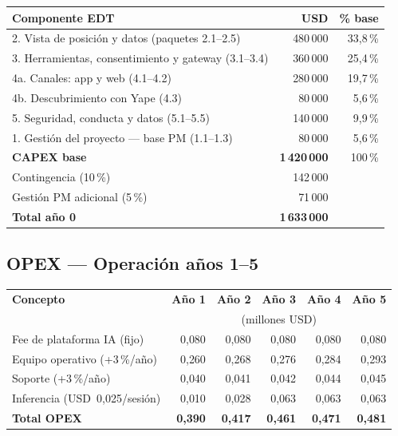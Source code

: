 \documentclass[11pt]{article}
\newcommand{\usd}[1]{USD~#1}
\begin{document}
\begin{tabularx}{\textwidth}{@{}X r r@{}}
\toprule
\textbf{Componente EDT} & \textbf{USD} & \textbf{\% base} \\
\midrule
2. Vista de posición y datos (paquetes 2.1–2.5)         & 480\,000 & 33{,}8\,\% \\
3. Herramientas, consentimiento y gateway (3.1–3.4)     & 360\,000 & 25{,}4\,\% \\
4a. Canales: app y web (4.1–4.2)                        & 280\,000 & 19{,}7\,\% \\
4b. Descubrimiento con Yape (4.3)                       &  80\,000 &  5{,}6\,\% \\
5. Seguridad, conducta y datos (5.1–5.5)                & 140\,000 &  9{,}9\,\% \\
1. Gestión del proyecto — base PM (1.1–1.3)             &  80\,000 &  5{,}6\,\% \\
\midrule
\textbf{CAPEX base}                                     & \textbf{1\,420\,000} & 100\,\% \\
Contingencia (10\,\%)                                   & 142\,000 & \\
Gestión PM adicional (5\,\%)                            &  71\,000 & \\
\midrule
\textbf{Total año 0}                                    & \textbf{1\,633\,000} & \\
\bottomrule
\end{tabularx}

\subsection{OPEX — Operación años 1–5}

\begin{tabularx}{\textwidth}{@{}X r r r r r@{}}
\toprule
\textbf{Concepto} & \textbf{Año 1} & \textbf{Año 2} & \textbf{Año 3} & \textbf{Año 4} & \textbf{Año 5} \\
 & \multicolumn{5}{c}{\footnotesize(millones USD)} \\
\midrule
Fee de plataforma IA (fijo)              & 0{,}080 & 0{,}080 & 0{,}080 & 0{,}080 & 0{,}080 \\
Equipo operativo (+3\,\%/año)            & 0{,}260 & 0{,}268 & 0{,}276 & 0{,}284 & 0{,}293 \\
Soporte (+3\,\%/año)                     & 0{,}040 & 0{,}041 & 0{,}042 & 0{,}044 & 0{,}045 \\
Inferencia (\usd{0,025}/sesión)          & 0{,}010 & 0{,}028 & 0{,}063 & 0{,}063 & 0{,}063 \\
\midrule
\textbf{Total OPEX}                      & \textbf{0{,}390} & \textbf{0{,}417} & \textbf{0{,}461} & \textbf{0{,}471} & \textbf{0{,}481} \\
\bottomrule
\end{tabularx}
\end{document}
